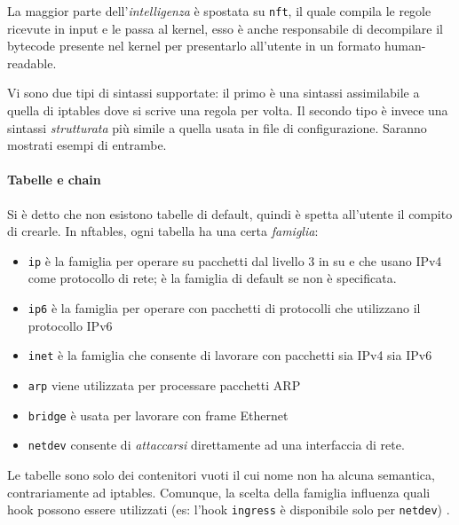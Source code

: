 La maggior parte dell'\textit{intelligenza} è spostata su \texttt{nft}, il quale compila
le regole ricevute in input e le passa al kernel, esso è anche responsabile di
decompilare il bytecode presente nel kernel per presentarlo all'utente in un
formato human-readable.

Vi sono due tipi di sintassi supportate: il primo è una sintassi assimilabile a quella
di iptables dove si scrive una regola per volta. Il secondo tipo è invece
una sintassi \textit{strutturata} più simile a quella usata in
file di configurazione. Saranno mostrati esempi di entrambe.


\paragraph{Tabelle e chain}
Si è detto che non esistono tabelle di default, quindi è spetta all'utente
il compito di crearle. In nftables, ogni tabella ha una certa \textit{famiglia}:
\begin{itemize}
	\item \texttt{ip} è la famiglia per operare su pacchetti dal livello 3 in su e
	      che usano IPv4 come protocollo di rete; è la famiglia di default se non è specificata.
	\item \texttt{ip6} è la famiglia per operare con pacchetti di protocolli che utilizzano
		il protocollo IPv6
	\item \texttt{inet} è la famiglia che consente di lavorare con pacchetti sia IPv4
	      sia IPv6
	\item \texttt{arp} viene utilizzata per processare pacchetti ARP
	\item \texttt{bridge} è usata per lavorare con frame Ethernet
	\item \texttt{netdev} consente di \textit{attaccarsi} direttamente ad una interfaccia
	      di rete.
\end{itemize}
Le tabelle sono solo dei contenitori vuoti il cui nome non ha alcuna semantica, contrariamente
ad iptables. Comunque, la scelta della famiglia influenza quali hook possono
essere utilizzati (es: l'hook \texttt{ingress} è disponibile solo per \texttt{netdev}) \cite{nftables-families}.

